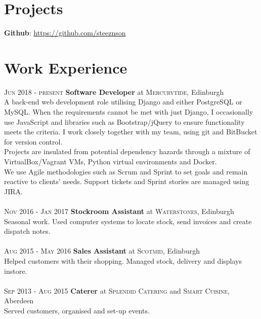 \documentclass[12pt, a4paper]{article}
\begin{document}
\begin{multicols}{2}
\section{Projects}
\noindent\textbf{Github}: \url{https://github.com/steeznson}

\columnbreak
\section{Work Experience}
\noindent\textsc{Jun 2018 - present} \textbf{Software Developer}
at \textsc{Mercurytide}, Edinburgh\\
A back-end web development role utilising Django and either PostgreSQL or MySQL. When the requirements cannot be met with just Django, I occasionally use JavaScript and libraries such as Bootstrap/jQuery to ensure functionality meets the criteria. I work closely together with my team, using git and BitBucket for version control.\\
Projects are insulated from potential dependency hazards through a mixture of VirtualBox/Vagrant VMs, Python virtual environments and Docker.\\
We use Agile methodologies such as Scrum and Sprint to set goals and remain reactive to clients' needs. Support tickets and Sprint stories are managed using JIRA.\\~\\
\textsc{Nov 2016 - Jan 2017} \textbf{Stockroom Assistant}
at \textsc{Waterstones}, Edinburgh\\
Seasonal work. Used computer systems to locate stock, send invoices and create dispatch notes.\\~\\
\textsc{Aug 2015 - May 2016} \textbf{Sales Assistant}
at \textsc{Scotmid}, Edinburgh\\
Helped customers with their shopping. Managed stock, delivery and displays instore.\\~\\
\textsc{Sep 2013 - Aug 2015} \textbf{Caterer}
at \textsc{Splendid Catering} and \textsc{Smart Cuisine}, Aberdeen\\
Served customers, organised and set-up events.

\end{multicols}
\end{document}
